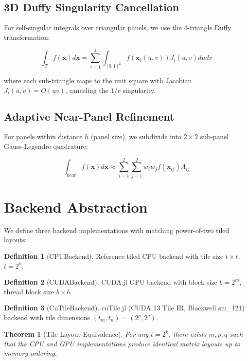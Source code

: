 \documentclass[12pt]{article}
\newtheorem{theorem}{Theorem}
\theoremstyle{definition}
\newtheorem{definition}{Definition}
\begin{document}
\subsection{3D Duffy Singularity Cancellation}

For self-singular integrals over triangular panels, we use the 4-triangle Duffy transformation:

\begin{equation}
\int_T f(\mathbf{x}) d\mathbf{x} = \sum_{i=1}^4 \int_{[0,1]^2} f(\mathbf{x}_i(u,v)) J_i(u,v) du dv
\end{equation}

where each sub-triangle maps to the unit square with Jacobian $J_i(u,v) = O(uv)$, canceling the $1/r$ singularity.

\subsection{Adaptive Near-Panel Refinement}

For panels within distance $h$ (panel size), we subdivide into $2 \times 2$ sub-panel Gauss-Legendre quadrature:

\begin{equation}
\int_{\text{near}} f(\mathbf{x}) d\mathbf{x} \approx \sum_{i=1}^2 \sum_{j=1}^2 w_i w_j f(\mathbf{x}_{ij}) A_{ij}
\end{equation}

\section{Backend Abstraction}

We define three backend implementations with matching power-of-two tiled layouts:

\begin{definition}[CPUBackend]
Reference tiled CPU backend with tile size $t \times t$, $t = 2^k$.
\end{definition}

\begin{definition}[CUDABackend]
CUDA.jl GPU backend with block size $b = 2^m$, thread block size $b \times b$.
\end{definition}

\begin{definition}[CuTileBackend]
cuTile.jl (CUDA 13 Tile IR, Blackwell sm\_121) backend with tile dimensions $(t_m, t_n) = (2^p, 2^q)$.
\end{definition}

\begin{theorem}[Tile Layout Equivalence]
For any $t = 2^k$, there exists $m, p, q$ such that the CPU and GPU implementations produce identical matrix layouts up to memory ordering.
\end{theorem}
\end{document}
